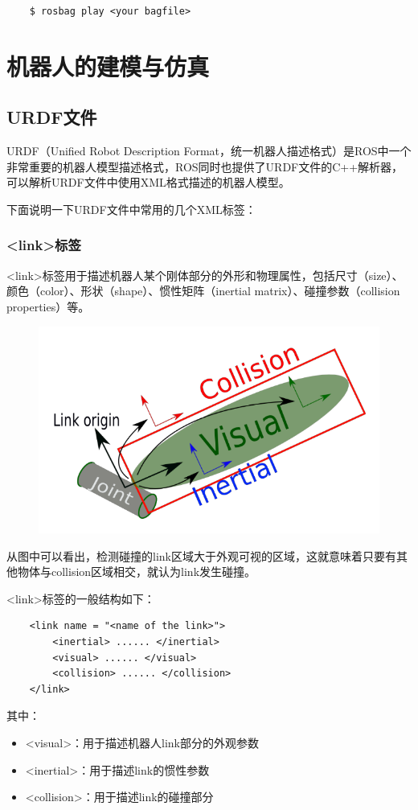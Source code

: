 \documentclass[10pt, oneside]{book}
\begin{document}
\begin{verbatim}
    $ rosbag play <your bagfile>
\end{verbatim}


\chapter{机器人的建模与仿真}

\section{URDF文件}

URDF（Unified Robot Description Format，统一机器人描述格式）是ROS中一个非常重要的机器人模型描述格式，ROS同时也提供了URDF文件的C++解析器，可以解析URDF文件中使用XML格式描述的机器人模型。

下面说明一下URDF文件中常用的几个XML标签：

\subsection{<link>标签}

<link>标签用于描述机器人某个刚体部分的外形和物理属性，包括尺寸（size）、颜色（color）、形状（shape）、惯性矩阵（inertial matrix）、碰撞参数（collision properties）等。

\begin{figure}[H]
    \centering
    \includegraphics[width = 0.4\linewidth]{image/link标签.png}
\end{figure}

从图中可以看出，检测碰撞的link区域大于外观可视的区域，这就意味着只要有其他物体与collision区域相交，就认为link发生碰撞。

<link>标签的一般结构如下：

\begin{verbatim}
    <link name = "<name of the link>">
        <inertial> ...... </inertial>
        <visual> ...... </visual>
        <collision> ...... </collision>
    </link>
\end{verbatim}

其中：
\begin{itemize}
    \item <visual>：用于描述机器人link部分的外观参数
    \item <inertial>：用于描述link的惯性参数
    \item <collision>：用于描述link的碰撞部分
\end{itemize}
\end{document}
